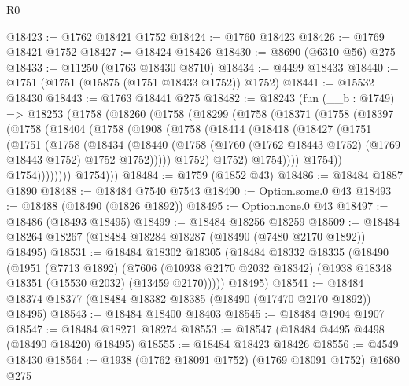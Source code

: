 \begin{lexlean}{R0}
\begin{coremodule}
@18423 := @1762 @18421 @1752
@18424 := @1760 @18423
@18426 := @1769 @18421 @1752
@18427 := @18424 @18426
@18430 := @8690 (@6310 @56) @275
@18433 := @11250 (@1763 @18430 @8710)
@18434 := @4499 @18433
@18440 := @1751 (@1751 (@15875 (@1751 @18433 @1752)) @1752)
@18441 := @15532 @18430
@18443 := @1763 @18441 @275
@18482 := @18243
    (fun (__b : @1749) =>
    @18253
      (@1758
        (@18260
          (@1758
            (@18299
              (@1758
                (@18371
                  (@1758
                    (@18397
                      (@1758
                        (@18404
                          (@1758
                            (@1908
                              (@1758
                                (@18414
                                  (@18418
                                    (@18427
                                      (@1751
                                        (@1751
                                          (@1758
                                            (@18434
                                              (@18440
                                                (@1758
                                                  (@1760
                                                    (@1762 @18443 @1752)
                                                    (@1769 @18443 @1752)
                                                    @1752
                                                    @1752)))))
                                          @1752)
                                        @1752)
                                      @1754))))
                              @1754))
                          @1754))))))))
          @1754)))
@18484 := @1759 (@1852 @43)
@18486 := @18484 @1887 @1890
@18488 := @18484 @7540 @7543
@18490 := Option.some.{0} @43
@18493 := @18488 (@18490 (@1826 @1892))
@18495 := Option.none.{0} @43
@18497 := @18486 (@18493 @18495)
@18499 := @18484 @18256 @18259
@18509 := @18484 @18264 @18267 (@18484 @18284 @18287 (@18490 (@7480 @2170 @1892)) @18495)
@18531 := @18484
    @18302
    @18305
    (@18484
      @18332
      @18335
      (@18490
        (@1951
          (@7713 @1892)
          (@7606 (@10938 @2170 @2032 @18342) (@1938 @18348 @18351 (@15530 @2032) (@13459 @2170)))))
      @18495)
@18541 := @18484 @18374 @18377 (@18484 @18382 @18385 (@18490 (@17470 @2170 @1892)) @18495)
@18543 := @18484 @18400 @18403
@18545 := @18484 @1904 @1907
@18547 := @18484 @18271 @18274
@18553 := @18547 (@18484 @4495 @4498 (@18490 @18420) @18495)
@18555 := @18484 @18423 @18426
@18556 := @4549 @18430
@18564 := @1938 (@1762 @18091 @1752) (@1769 @18091 @1752) @1680 @275

\end{coremodule}
\end{lexlean}
